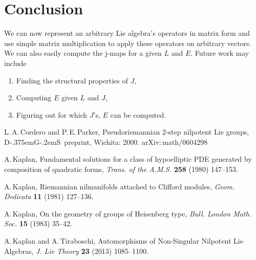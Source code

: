 \documentclass[11 pt]{article}
\newcommand{\DGS}{D{\kern-.375em}G{\kern-.2em}S}
\begin{document}
\section{Conclusion}
    We can now represent an arbitrary Lie algebra's operators in matrix form
    and use simple matrix multiplication to apply these operators on
    arbitrary vectors.  We can also easily compute the j-maps for a given $L$
    and $E$.  Future work may include
    \begin{enumerate}
        \item Finding the structural properties of $J$,
        \item Computing $E$ given $L$ and $J$,
        \item Figuring out for which $J$'s, $E$ can be computed.
    \end{enumerate}

\begin{thebibliography}{99}
L.\,A.\,Cordero and P.\,E.\,Parker, Pseudoriemannian 2-step
nilpotent Lie groups, \DGS\ preprint, Wichita: 2000.
{\sf arXiv:\,math/0604298}

A.\,Kaplan, Fundamental solutions for a class of hypoelliptic PDE
generated by composition of quadratic forms, {\it Trans. of the A.M.S.}
{\bf 258}
(1980) 147--153.

A.\,Kaplan, Riemannian nilmanifolds attached to Clifford modules,
{\it Geom. Dedicata} {\bf 11} (1981) 127--136.

A.\,Kaplan, On the geometry of groups of Heisenberg type, {\it Bull.
London Math. Soc.} {\bf 15} (1983) 35--42.

A.\,Kaplan and A.\,Tiraboschi, Automorphisms of Non-Singular
Nilpotent Lie Algebras, {\it J. Lie Theory} {\bf 23} (2013) 1085--1100.
\end{thebibliography}
\end{document}
